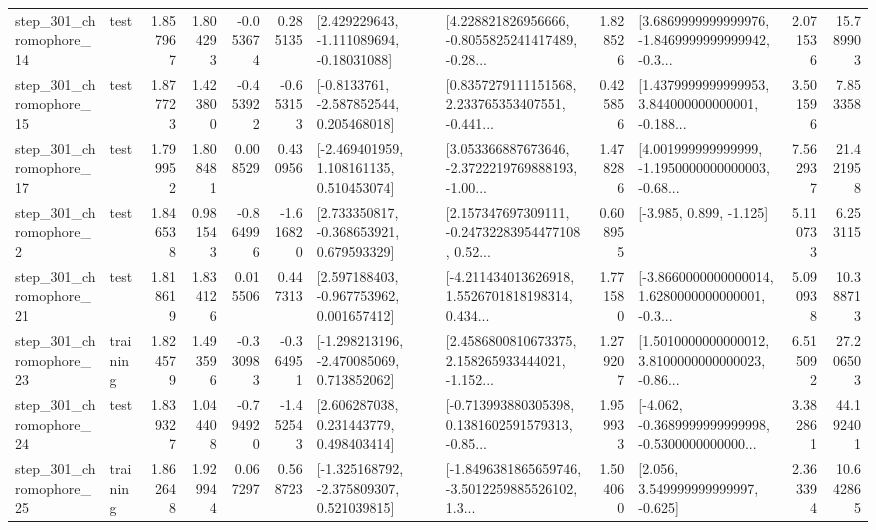 \begin{tabular}{llrrrrllrlrr}
  step\_301\_chromophore\_14 &      test &      1.857967 &    1.804293 &     -0.053674 &  0.285135 &    [2.429229643, -1.111089694, -0.18031088] &  [4.228821826956666, -0.8055825241417489, -0.28... &       1.828526 &  [3.6869999999999976, -1.8469999999999942, -0.3... &            2.071536 &         15.789903 \\
  step\_301\_chromophore\_15 &      test &      1.877723 &    1.423800 &     -0.453922 & -0.653153 &     [-0.8133761, -2.587852544, 0.205468018] &  [0.8357279111151568, 2.233765353407551, -0.441... &       0.425856 &  [1.4379999999999953, 3.844000000000001, -0.188... &            3.501596 &          7.853358 \\
  step\_301\_chromophore\_17 &      test &      1.799952 &    1.808481 &      0.008529 &  0.430956 &    [-2.469401959, 1.108161135, 0.510453074] &  [3.053366887673646, -2.3722219769888193, -1.00... &       1.478286 &  [4.001999999999999, -1.1950000000000003, -0.68... &            7.562937 &         21.421958 \\
   step\_301\_chromophore\_2 &      test &      1.846538 &    0.981543 &     -0.864996 & -1.616820 &    [2.733350817, -0.368653921, 0.679593329] &  [2.157347697309111, -0.24732283954477108, 0.52... &       0.608955 &                            [-3.985, 0.899, -1.125] &            5.110733 &          6.253115 \\
  step\_301\_chromophore\_21 &      test &      1.818619 &    1.834126 &      0.015506 &  0.447313 &    [2.597188403, -0.967753962, 0.001657412] &  [-4.211434013626918, 1.5526701818198314, 0.434... &       1.771580 &  [-3.8660000000000014, 1.6280000000000001, -0.3... &            5.090938 &         10.388713 \\
  step\_301\_chromophore\_23 &  training &      1.824579 &    1.493596 &     -0.330983 & -0.364951 &   [-1.298213196, -2.470085069, 0.713852062] &  [2.4586800810673375, 2.158265933444021, -1.152... &       1.279207 &  [1.5010000000000012, 3.8100000000000023, -0.86... &            6.515092 &         27.206503 \\
  step\_301\_chromophore\_24 &      test &      1.839327 &    1.044408 &     -0.794920 & -1.452543 &     [2.606287038, 0.231443779, 0.498403414] &  [-0.713993880305398, 0.1381602591579313, -0.85... &       1.959933 &  [-4.062, -0.3689999999999998, -0.5300000000000... &            3.382861 &         44.192401 \\
  step\_301\_chromophore\_25 &  training &      1.862648 &    1.929944 &      0.067297 &  0.568723 &   [-1.325168792, -2.375809307, 0.521039815] &  [-1.8496381865659746, -3.5012259885526102, 1.3... &       1.504060 &                 [2.056, 3.549999999999997, -0.625] &            2.363394 &         10.642865 \\

\end{tabular}
